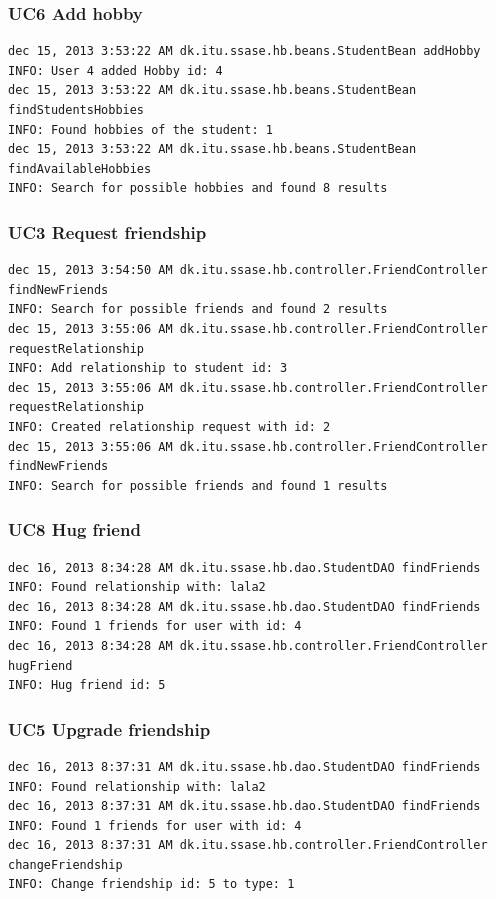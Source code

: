 \documentclass[a4paper]{article}
\begin{document}
\subsubsection{UC6 Add hobby}
\begin{verbatim}
dec 15, 2013 3:53:22 AM dk.itu.ssase.hb.beans.StudentBean addHobby
INFO: User 4 added Hobby id: 4 
dec 15, 2013 3:53:22 AM dk.itu.ssase.hb.beans.StudentBean findStudentsHobbies
INFO: Found hobbies of the student: 1
dec 15, 2013 3:53:22 AM dk.itu.ssase.hb.beans.StudentBean findAvailableHobbies
INFO: Search for possible hobbies and found 8 results
\end{verbatim}

\subsubsection{UC3 Request friendship}
\begin{verbatim}
dec 15, 2013 3:54:50 AM dk.itu.ssase.hb.controller.FriendController 
findNewFriends
INFO: Search for possible friends and found 2 results
dec 15, 2013 3:55:06 AM dk.itu.ssase.hb.controller.FriendController 
requestRelationship
INFO: Add relationship to student id: 3
dec 15, 2013 3:55:06 AM dk.itu.ssase.hb.controller.FriendController 
requestRelationship
INFO: Created relationship request with id: 2
dec 15, 2013 3:55:06 AM dk.itu.ssase.hb.controller.FriendController 
findNewFriends
INFO: Search for possible friends and found 1 results
\end{verbatim}

\subsubsection{UC8 Hug friend}
\begin{verbatim}
dec 16, 2013 8:34:28 AM dk.itu.ssase.hb.dao.StudentDAO findFriends
INFO: Found relationship with: lala2
dec 16, 2013 8:34:28 AM dk.itu.ssase.hb.dao.StudentDAO findFriends
INFO: Found 1 friends for user with id: 4
dec 16, 2013 8:34:28 AM dk.itu.ssase.hb.controller.FriendController hugFriend
INFO: Hug friend id: 5
\end{verbatim}

\subsubsection{UC5 Upgrade friendship}
\begin{verbatim}
dec 16, 2013 8:37:31 AM dk.itu.ssase.hb.dao.StudentDAO findFriends
INFO: Found relationship with: lala2
dec 16, 2013 8:37:31 AM dk.itu.ssase.hb.dao.StudentDAO findFriends
INFO: Found 1 friends for user with id: 4
dec 16, 2013 8:37:31 AM dk.itu.ssase.hb.controller.FriendController changeFriendship
INFO: Change friendship id: 5 to type: 1
\end{verbatim}
\end{document}
